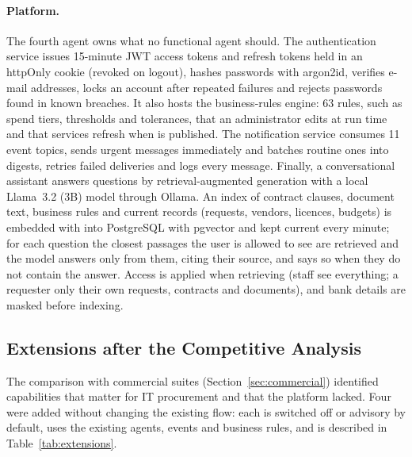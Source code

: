 \paragraph{Platform.} The fourth agent owns what no functional agent should. The authentication service issues 15-minute JWT access tokens and refresh tokens held in an httpOnly cookie (revoked on logout), hashes passwords with argon2id, verifies e-mail addresses, locks an account after repeated failures and rejects passwords found in known breaches. It also hosts the business-rules engine: 63 rules, such as spend tiers, thresholds and tolerances, that an administrator edits at run time and that services refresh when  is published. The notification service consumes 11 event topics, sends urgent messages immediately and batches routine ones into digests, retries failed deliveries and logs every message. Finally, a conversational assistant answers questions by retrieval-augmented generation with a local Llama~3.2 (3B) model through Ollama. An index of contract clauses, document text, business rules and current records (requests, vendors, licences, budgets) is embedded with  into PostgreSQL with pgvector and kept current every minute; for each question the closest passages the user is allowed to see are retrieved and the model answers only from them, citing their source, and says so when they do not contain the answer. Access is applied when retrieving (staff see everything; a requester only their own requests, contracts and documents), and bank details are masked before indexing.

\subsection{Extensions after the Competitive Analysis}\label{sec:extensions}
The comparison with commercial suites (Section~\ref{sec:commercial}) identified capabilities that matter for IT procurement and that the platform lacked. Four were added without changing the existing flow: each is switched off or advisory by default, uses the existing agents, events and business rules, and is described in Table~\ref{tab:extensions}.

